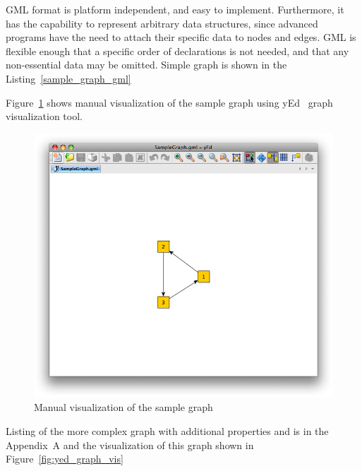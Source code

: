 GML format is platform independent, and easy to implement.
Furthermore, it has the capability to represent arbitrary data structures, since advanced programs have the need to attach their specific data to nodes and edges.
GML is flexible enough that a specific order of declarations is not needed, and that any non-essential data may be omitted. Simple graph is shown in the Listing~\ref{sample_graph_gml}

\begin{center}
    \renewcommand{\thelstlisting}{\thesection.\arabic{lstlisting}}
	
\end{center}

Figure~\ref{fig:sample_graph_yed_vis} shows manual visualization of the sample graph using yEd~\cite{yed} graph visualization tool.

\begin{figure}[h!]
\centering
\includegraphics[scale=0.5]{pictures/SampleGraph.png}
\caption{Manual visualization of the sample graph}
\label{fig:sample_graph_yed_vis}
\end{figure}

Listing of the more complex graph with additional properties and is in the Appendix~A and the visualization of this graph shown in Figure~\ref{fig:yed_graph_vis}

